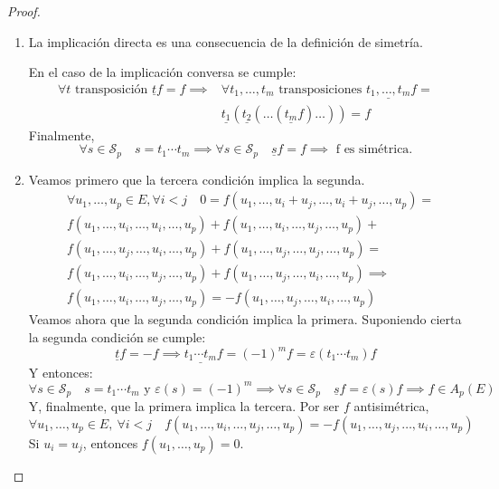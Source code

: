 \begin{proof}~
    \begin{enumerate}
        \item La implicación directa es una consecuencia de la definición de simetría.
        
        En el caso de la implicación conversa se cumple:
        \[
        \begin{split} \forall t \text{ transposición } \underline{t}f = f \implies & \forall 
        t_1,\dots ,t_m \text{ transposiciones } \underline{t_1,\dots,t_m} f =\\
        &\underline{t_1}(\underline{t_2}(\dots (\underline{t_m}f)\dots)) = f
        \end{split}
        \]
        Finalmente, 
        \[\forall s \in \mathcal{S}_p \quad s = t_1 \cdots t_m \implies \forall s \in 
        \mathcal{S}_p \quad \underline{s}f = f \implies \text{ f es simétrica.}\]
        
        \item Veamos primero que la tercera condición implica la segunda.
        \[\begin{split}
        &\forall u_1,\dots,u_p \in E, \forall i < j \quad 
        0 = f(u_1,\dots,u_i+u_j,\dots,u_i+u_j, \dots, u_p) =\\
        &f(u_1,\dots,u_i,\dots,u_i,\dots,u_p)+
        f(u_1,\dots,u_i,\dots,u_j,\dots,u_p)+\\
        &f(u_1,\dots,u_j,\dots,u_i,\dots,u_p)+
        f(u_1,\dots,u_j,\dots,u_j,\dots,u_p)=\\
        &f(u_1,\dots,u_i,\dots,u_j,\dots,u_p)+
        f(u_1,\dots,u_j,\dots,u_i,\dots,u_p)\implies\\
        &f(u_1,\dots,u_i,\dots,u_j,\dots,u_p) = 
        -f(u_1,\dots,u_j,\dots,u_i,\dots,u_p)
        \end{split}\]
        Veamos ahora que la segunda condición implica la primera. Suponiendo cierta
        la segunda condición se cumple:
        \[\underline{t}f = -f \implies \underline{t_1\cdots t_m}f = (-1)^mf =
        \varepsilon(t_1\cdots t_m)f\]
        Y entonces:
        \[\forall s \in \mathcal{S}_p \quad s = t_1\cdots t_m \text{ y } \varepsilon(s) = (-1)^m 
        \implies \forall s\in \mathcal{S}_p \quad \underline{s}f = \varepsilon(s)f
        \implies f \in A_p(E)\]
        Y, finalmente, que la primera implica la tercera. Por ser $f$ antisimétrica,
        \[
        \forall u_1,\dots,u_p \in E, \ \forall i < j \quad
        f(u_1,\dots, u_i, \dots, u_j, \dots, u_p) = -f(u_1,\dots, u_j, \dots, u_i, \dots, u_p)
        \]
        Si $u_i = u_j$, entonces $f(u_1, \dots, u_p) = 0$.
        
    \end{enumerate}
\end{proof}
